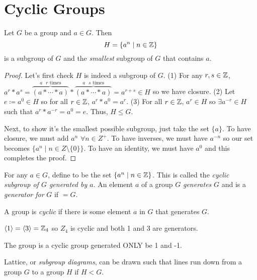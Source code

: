 \section{Cyclic Groups}

\begin{theorem}
    Let $G$ be a group and $a \in G$. Then $$H = \{a^n \mid n \in \mathbb{Z}\}$$ is a subgroup of $G$ and the \emph{smallest} subgroup of $G$ that contains $a$.
\end{theorem}
\begin{proof}
    Let's first check $H$ is indeed a subgroup of $G$. (1) For any $r,s \in \mathbb{Z}$, $a^r*a^s = \overbrace{(a*\cdots*a)}^{\text{$a$ $r$ times}}*\overbrace{(a*\cdots*a)}^{\text{$a$ $s$ times}}=a^{r+s} \in H$ so we have closure. (2) Let $e \coloneq a^0 \in H$ so for all $r \in \mathbb{Z}$, $a^r*a^0=a^r$. (3) For all $r \in \mathbb{Z}$, $a^r \in H$ so $\exists a^{-r} \in H$ such that $a^r*a^{-r} = a^0 = e$. Thus, $H \leq G$.

    Next, to show it's the smallest possible subgroup, just take the set $\{a\}$. To have closure, we must add $a^n$ $\forall n\in Z^+$. To have inverses, we must have $a^{-n}$ so our set becomes $\{a^n \mid n \in Z\setminus\{0\}\}$. To have an identity, we must have $a^0$ and this completes the proof.
\end{proof}
\begin{definition}
    For any $a \in G$, define  to be the set $\{a^n \mid n \in \mathbb{Z}\}$. This is called the \emph{cyclic subgroup of $G$ generated by $a$}. An element $a$ of a group $G$ \emph{generates} $G$ and is a \emph{generator for} $G$ if  $= G$.
\end{definition}
\begin{definition}
    A group is \emph{cyclic} if there is some element $a$ in $G$ that generates $G$.
\end{definition}
\begin{example}
    $\langle 1 \rangle = \langle 3 \rangle = \mathbb{Z}_4$ so $Z_4$ is cyclic and both 1 and 3 are generators.
\end{example}
\begin{example}
    The group \group{$\Z$}{+} is a cyclic group generated ONLY be 1 and -1.
\end{example}
\begin{remark}
    Lattice, or \emph{subgroup diagrams}, can be drawn such that lines run down from a group $G$ to a group $H$ if $H < G$. 
\end{remark}

